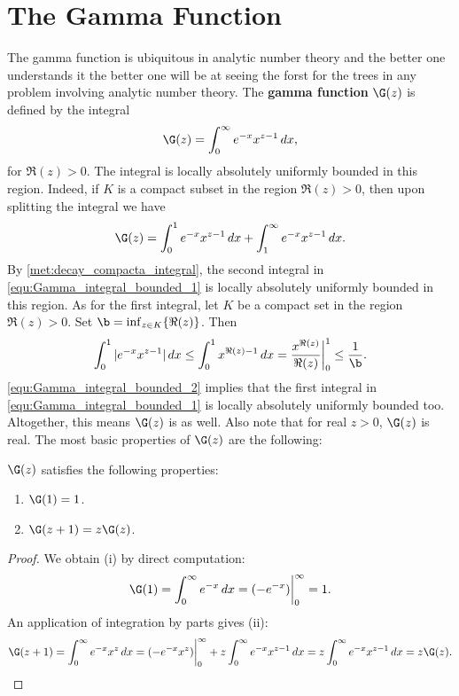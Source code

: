     \section{The Gamma Function}
      The gamma function is ubiquitous in analytic number theory and the better one understands it the better one will be at seeing the forst for the trees in any problem involving analytic number theory. The \textbf{gamma function} $\G(z)$ is defined by the integral
      \[
        \G(z) = \int_{0}^{\infty}e^{-x}x^{z-1}\,dx,
      \]
      for $\Re(z) > 0$. The integral is locally absolutely uniformly bounded in this region. Indeed, if $K$ is a compact subset in the region $\Re(z) > 0$, then upon splitting the integral we have
      \begin{equation}\label{equ:Gamma_integral_bounded_1}
        \G(z) = \int_{0}^{1}e^{-x}x^{z-1}\,dx+\int_{1}^{\infty}e^{-x}x^{z-1}\,dx.
      \end{equation}
      By \cref{met:decay_compacta_integral}, the second integral in \cref{equ:Gamma_integral_bounded_1} is locally absolutely uniformly bounded in this region. As for the first integral, let $K$ be a compact set in the region $\Re(z) > 0$. Set $\b = \inf_{z \in K}\{\Re(z)\}$. Then
      \begin{equation}\label{equ:Gamma_integral_bounded_2}
        \int_{0}^{1}|e^{-x}x^{z-1}|\,dx \le \int_{0}^{1}x^{\Re(z)-1}\,dx = \frac{x^{\Re(z)}}{\Re(z)}\bigg|_{0}^{1} \le \frac{1}{\b}.
      \end{equation}
      \cref{equ:Gamma_integral_bounded_2} implies that the first integral in \cref{equ:Gamma_integral_bounded_1} is locally absolutely uniformly bounded too. Altogether, this means $\G(z)$ is as well. Also note that for real $z > 0$, $\G(z)$ is real. The most basic properties of $\G(z)$ are the following:

      \begin{proposition}\label{prop:Factorial_properties_of_gamma_function}
        $\G(z)$ satisfies the following properties:
        \begin{enumerate}[label=(\roman*)]
          \item $\G(1) = 1$.
          \item $\G(z+1) = z\G(z)$.
        \end{enumerate}
      \end{proposition}
      \begin{proof}
        We obtain (i) by direct computation:
        \[
          \G(1) = \int_{0}^{\infty}e^{-x}\,dx = (-e^{-x})\bigg|_{0}^{\infty} = 1.
        \]
        An application of integration by parts gives (ii):
        \[
          \G(z+1) = \int_{0}^{\infty}e^{-x}x^{z}\,dx = (-e^{-x}x^{z})\bigg|_{0}^{\infty}+z\int_{0}^{\infty}e^{-x}x^{z-1}\,dx = z\int_{0}^{\infty}e^{-x}x^{z-1}\,dx = z\G(z).
        \]
      \end{proof}

